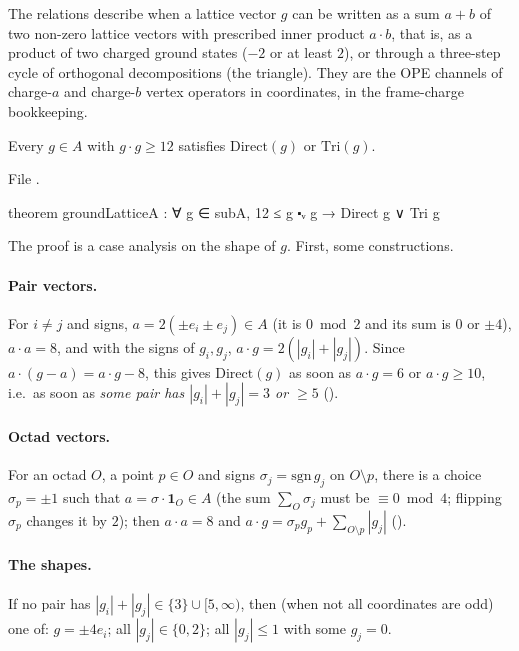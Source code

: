 \begin{physics}
The relations describe when a lattice vector $g$ can be written as a sum $a+b$ of two non-zero lattice vectors with prescribed inner product $a\cdot b$, that is, as a product of two charged ground states ($-2$ or at least $2$), or through a three-step cycle of orthogonal decompositions (the triangle). They are the OPE channels of charge-$a$ and charge-$b$ vertex operators in coordinates, in the frame-charge bookkeeping.
\end{physics}

\begin{theorem}\label{ch12:thm:groundLatticeA}
Every $g\in A$ with $g\cdot g\ge12$ satisfies $\mathrm{Direct}(g)$ or $\mathrm{Tri}(g)$.
\end{theorem}
File .
\begin{leancode}
theorem groundLatticeA : ∀ g ∈ subA, 12 ≤ g ⬝ᵥ g → Direct g ∨ Tri g
\end{leancode}

The proof is a case analysis on the shape of $g$.  First, some constructions.

\paragraph{Pair vectors.}  For $i\neq j$ and signs, $a=2(\pm e_i\pm e_j)\in A$ (it is $0\bmod 2$ and its sum
is $0$ or $\pm4$), $a\cdot a=8$, and with the signs of $g_i,g_j$, $a\cdot g=2(|g_i|+|g_j|)$.  Since
$a\cdot(g-a)=a\cdot g-8$, this gives $\mathrm{Direct}(g)$ as soon as $a\cdot g=6$ or $a\cdot g\ge10$, i.e.\ as
soon as \emph{some pair has $|g_i|+|g_j|=3$ or $\ge5$} ().

\paragraph{Octad vectors.}  For an octad $O$, a point $p\in O$ and signs $\sigma_j=\mathrm{sgn}\,g_j$ on
$O\setminus p$, there is a choice $\sigma_p=\pm1$ such that $a=\sigma\cdot\mathbf 1_O\in A$ (the sum
$\sum_O\sigma_j$ must be $\equiv0\bmod4$; flipping $\sigma_p$ changes it by $2$); then $a\cdot a=8$ and
$a\cdot g=\sigma_pg_p+\sum_{O\setminus p}|g_j|$ ().

\paragraph{The shapes.}  If no pair has $|g_i|+|g_j|\in\{3\}\cup[5,\infty)$, then (when not all coordinates are
odd) one of: $g=\pm4e_i$; all $|g_j|\in\{0,2\}$; all $|g_j|\le1$ with some $g_j=0$.

